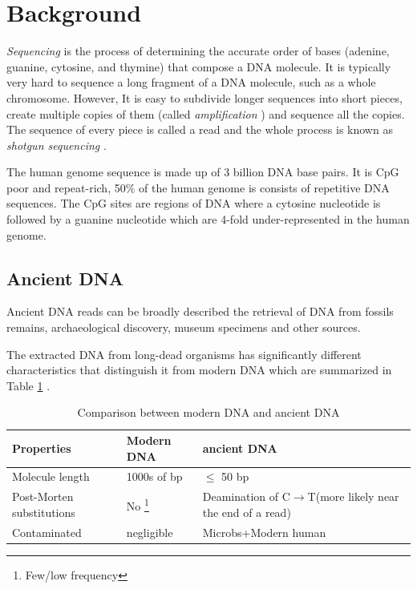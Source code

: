 \documentclass[11pt,a4paper]{report}
\begin{document}


\clearpage
\section{Background } \label{Background }


\emph{Sequencing} is the process of determining the accurate order of bases 
(adenine, guanine, cytosine, and thymine) that compose a DNA molecule. 
It is typically very hard to sequence a long fragment of a DNA molecule, 
such as a whole chromosome. However, It is easy to subdivide longer sequences
into short pieces, create multiple copies of them (called \emph{amplification} ) 
and sequence all the copies. The sequence of every piece is called a read and 
the whole process is known as \emph{shotgun sequencing} \cite{algorithmDesign}.


The human genome sequence is made up of 3 billion DNA base pairs.
It is CpG poor and repeat-rich, 50\% of the human genome is consists 
of repetitive DNA sequences. The CpG sites are regions of DNA where 
a cytosine nucleotide is followed by a guanine nucleotide which are 
4-fold under-represented in the human genome. 



\subsection{Ancient DNA } \label{Ancient DNA }

Ancient DNA reads can be broadly described the retrieval of DNA from fossils 
remains, archaeological discovery, museum specimens and other sources.

The extracted DNA from long-dead organisms has significantly different 
characteristics that distinguish it from modern DNA which are summarized in 
Table \ref{aDNAchar} .\\


\begin{savenotes}
 \begin{table}[H]
  \begin{tabular}{ |  p{4cm} | p{2cm} | p{5cm} |}
    \hline
     \textbf{  Properties} & \textbf{Modern DNA } &\textbf{ ancient DNA} \\ \hline
     Molecule  length &  1000s of bp  & $\leq$  50 bp\\ \hline
     Post-Morten \hspace{35pt} substitutions & No \footnote{Few/low frequency}
     & Deamination of C$\to$T(more likely near the end of a read) \\ \hline
     Contaminated & negligible & Microbs+Modern human\\ \hline
  \end{tabular}
  \caption{Comparison between modern DNA and ancient DNA}
  \label{aDNAchar}
 \end{table}
\end{savenotes}
\end{document}
